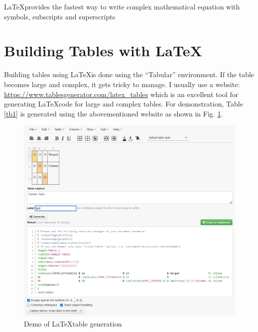 \documentclass[a4paper, 12pt, one column]{article}
\begin{document}
    \vspace{0.3cm}

     {
            {
            \begin{minipage}{0.9\textwidth}
                \centering
            \LaTeX \space provides the fastest way to write complex mathematical equation with symbols, subscripts and superscripts
            \end{minipage}
            }
        }

\section{Building Tables with \LaTeX}

Building tables using \LaTeX is done using the ``Tabular'' environment.  If the table becomes large and complex, it gets tricky to manage. I usually use a website: \url{https://www.tablesgenerator.com/latex_tables} which is an excellent tool for generating \LaTeX \space code for large and complex tables. For demonstration, Table \ref{tb1} is generated using the abovementioned website as shown in Fig. \ref{tbDemo}. 

\begin{figure}[!httb]
    \centering
    \includegraphics[width=0.9\linewidth]{Capture.PNG}
    \caption{ Demo of \LaTeX \space table generation}
    \label{tbDemo}
    \end{figure}
\end{document}
